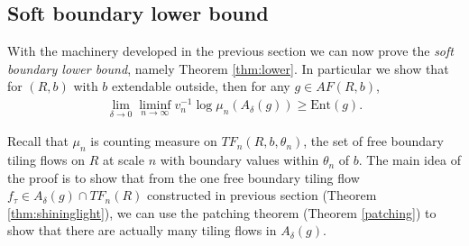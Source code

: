 \documentclass[11pt]{article}
\theoremstyle{remark}
\theoremstyle{definition}
\newcommand{\Ent}{\text{Ent}}
\begin{document}
\subsection{Soft boundary lower bound}\label{sec:lower}

With the machinery developed in the previous section we can now prove the \textit{soft boundary lower bound}, namely Theorem \ref{thm:lower}. In particular we show that for $(R,b)$ with $b$ extendable outside, then for any $g\in AF(R, b)$,
\begin{align*}
    \lim_{\delta\to 0}\liminf_{n\to \infty} v_n^{-1} \log \mu_n(A_{\delta}( g)) \geq \Ent( g).
\end{align*}

Recall that $\mu_n$ is counting measure on $TF_n(R, b, \theta_n)$, the set of free boundary tiling flows on $R$ at scale $n$ with boundary values within $\theta_n$ of $b$. The main idea of the proof is to show that from the one free boundary tiling flow $f_\tau\in A_\delta(g)\cap TF_n(R)$ constructed in previous section (Theorem \ref{thm:shininglight}), we can use the patching theorem (Theorem \ref{patching}) to show that there are actually many tiling flows in $A_\delta(g)$. 
\end{document}
